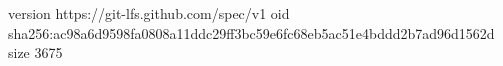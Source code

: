 version https://git-lfs.github.com/spec/v1
oid sha256:ac98a6d9598fa0808a11ddc29ff3bc59e6fc68eb5ac51e4bddd2b7ad96d1562d
size 3675

